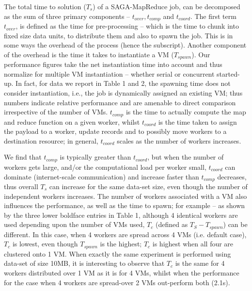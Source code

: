 \documentclass[3p,twocolumn]{elsarticle}
\newcommand{\sagamapreduce }{SAGA-MapReduce }
\begin{document}
The total time to solution ($T_s$) of a \sagamapreduce job, can be
decomposed as the sum of three primary components -- $t_{over},
t_{comp}$ and $t_{coord}$.  The first term $t_{over}$, is defined as
the time for pre-processing -- which is the time to chunk into fixed
size data units, to distribute them and also to spawn the job. This is
in some ways the overhead of the process (hence the subscript).
Another component of the overhead is the time it takes to instantiate
a VM ($T_{spawn}$).
Our performance figures take the net instantiation time into account
and thus normalize for multiple VM instantiation -- whether serial or
concurrent started-up. In fact, for data we report in Table 1 and 2,
the spawning time does not consider instantiation, i.e., the job is
dynamically assigned an existing VM; thus numbers indicate relative
performance and are amenable to direct comparison irrespective of the
number of VMs.  $t_{comp}$ is the time to actually compute the map and
reduce function on a given worker, whilst $t_{coord}$ is the time
taken to assign the payload to a worker, update records and to
possibly move workers to a destination resource; in general,
$t_{coord}$ scales as the number of workers increases.

We find that $t_{comp}$ is typically greater than $t_{coord}$, but
when the number of workers gets large, and/or the computational load
per worker small, $t_{coord}$ can dominate (internet-scale
communication) and increase faster than $t_{comp}$ decreases, thus
overall $T_s$ can increase for the same data-set size, even though the
number of independent workers increases.  The number of workers
associated with a VM also influences the performance, as well as the
time to spawn; for example -- as shown by the three lower boldface
entries in Table 1, although 4 identical workers are used depending
upon the number of VMs used, $T_c$ (defined as $T_S - T_{spawn} $) can
be different.  In this case, when 4 workers are spread across 4 VMs
(i.e. default case), $T_c$ is lowest, even though $T_{spawn}$ is the
highest; $T_c$ is highest when all four are clustered onto 1 VM. When
exactly the same experiment is performed using data-set of size 10MB,
it is interesting to observe that $T_c$ is the same for 4 workers
distributed over 1 VM as it is for 4 VMs, whilst when the performance
for the case when  4 workers are spread-over 2 VMs out-perform both (2.1s).
\end{document}
